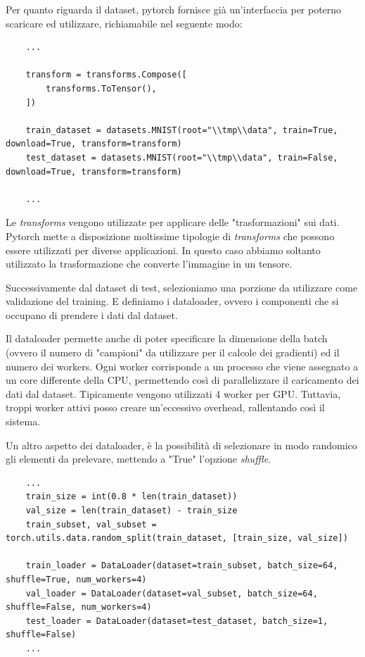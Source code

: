 Per quanto riguarda il dataset, pytorch fornisce già un'interfaccia per poterno
scaricare ed utilizzare, richiamabile nel seguente modo:

\begin{lstlisting}
    ...

    transform = transforms.Compose([
        transforms.ToTensor(),
    ])

    train_dataset = datasets.MNIST(root="\\tmp\\data", train=True, download=True, transform=transform)
    test_dataset = datasets.MNIST(root="\\tmp\\data", train=False, download=True, transform=transform)

    ...
\end{lstlisting}

Le \textit{transforms} vengono utilizzate per applicare delle "trasformazioni"
sui dati. Pytorch mette a disposizione moltissime tipologie di \textit{transforms} 
che possono essere utilizzati per diverse applicazioni.
In questo caso abbiamo soltanto utilizzato la trasformazione che converte l'immagine
in un tensore.


Successivamente dal dataset di test, selezioniamo una porzione da utilizzare come 
validazione del training. E definiamo i dataloader, ovvero i componenti che si 
occupano di prendere i dati dal dataset. 

Il dataloader permette anche di poter specificare la dimensione della batch (ovvero 
il numero di "campioni" da utilizzare per il calcole dei gradienti) ed il numero 
dei workers. Ogni worker corrisponde a un processo che viene assegnato 
a un core differente della CPU, permettendo così di parallelizzare il caricamento 
dei dati dal dataset. Tipicamente vengono utilizzati 4 worker per GPU. Tuttavia,
troppi worker attivi posso creare un'eccessivo overhead, rallentando così il sistema.

Un altro aspetto dei dataloader, è la possibilità di selezionare in modo randomico
gli elementi da prelevare, mettendo a "True" l'opzione \textit{shuffle}.

\begin{lstlisting}
    ...
    train_size = int(0.8 * len(train_dataset))
    val_size = len(train_dataset) - train_size
    train_subset, val_subset = torch.utils.data.random_split(train_dataset, [train_size, val_size])

    train_loader = DataLoader(dataset=train_subset, batch_size=64, shuffle=True, num_workers=4)
    val_loader = DataLoader(dataset=val_subset, batch_size=64, shuffle=False, num_workers=4)
    test_loader = DataLoader(dataset=test_dataset, batch_size=1, shuffle=False)
    ...
\end{lstlisting}


